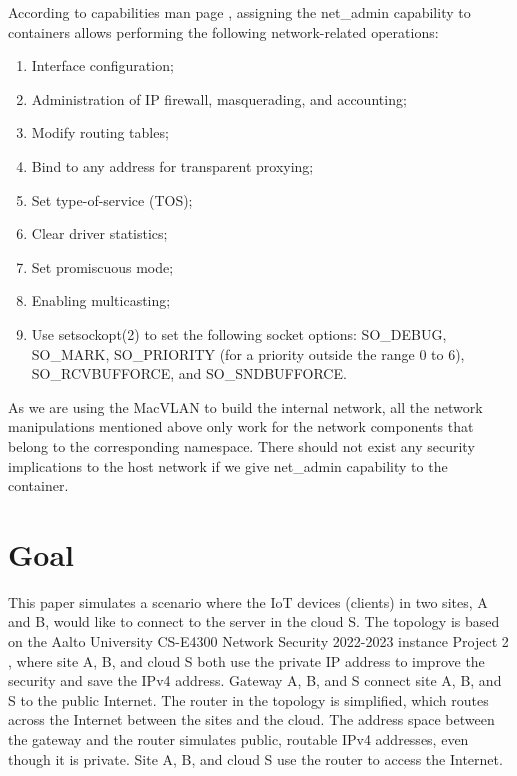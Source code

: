 \documentclass[article]{aaltoseries}
\begin{document}
According to capabilities man page \cite{capabilities}, assigning the net\_admin capability to containers allows performing the following network-related operations:
\begin{enumerate}
\setlength{\itemsep}{0pt}
\setlength{\parsep}{0pt}
\setlength{\parskip}{0pt}
\item Interface configuration;
\item Administration of IP firewall, masquerading, and accounting;
\item Modify routing tables;
\item Bind to any address for transparent proxying;
\item Set type-of-service (TOS);
\item Clear driver statistics;
\item Set promiscuous mode;
\item Enabling multicasting;
\item Use setsockopt(2) to set the following socket options:
SO\_DEBUG, SO\_MARK, SO\_PRIORITY (for a priority outside the
range 0 to 6), SO\_RCVBUFFORCE, and SO\_SNDBUFFORCE.
\end{enumerate}

As we are using the MacVLAN to build the internal network, all the network manipulations mentioned above only work for the network components that belong to the corresponding namespace. There should not exist any security implications to the host network if we give net\_admin capability to the container.




\section{Goal}

This paper simulates a scenario where the IoT devices (clients) in two sites, A and B, would like to connect to the server in the cloud S. The topology is based on the Aalto University CS-E4300 Network Security 2022-2023 instance Project 2 \cite{aura_peltonen_bui_2022}, where site A, B, and cloud S both use the private IP address to improve the security and save the IPv4 address. Gateway A, B, and S connect site A, B, and S to the public Internet. The router in the topology is simplified, which routes across the Internet between the sites and the cloud. The address space between the gateway and the router simulates public, routable IPv4 addresses, even though it is private. Site A, B, and cloud S use the router to access the Internet.
\end{document}
